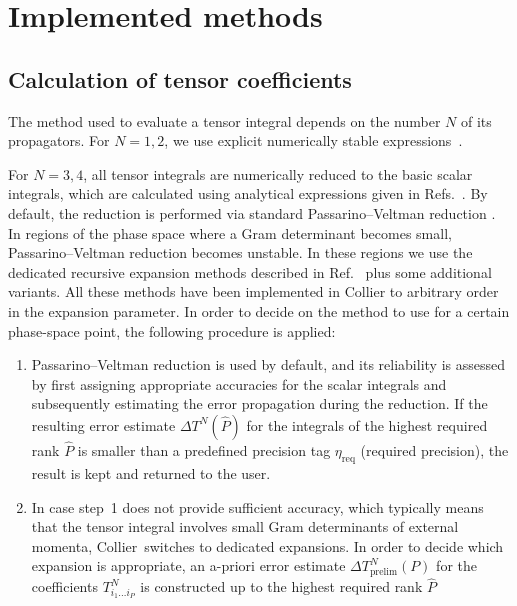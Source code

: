 \documentclass[preprint,sort&compress,12pt]{elsarticle}
\def\citere#1{\mbox{Ref.~\cite{#1}}}
\def\citeres#1{\mbox{Refs.~\cite{#1}}}
\newcommand{\collier}{{\sc Collier}}
\begin{document}
\section{Implemented methods}
\label{se:methods}

\subsection{Calculation of tensor coefficients}
\label{sec:calc-tensor-coefficients}

The method used to evaluate a tensor integral depends on the number
$N$ of its propagators. For $N=1,2$, we use explicit numerically stable
expressions~\cite{Passarino:1978jh,Denner:2005nn}.

\begin{sloppypar}
For $N=3,4$, all tensor integrals are numerically 
reduced to the basic scalar
integrals, which are calculated using analytical expressions
given in \citeres{Dittmaier:2003bc,'tHooft:1978xw,Denner:2010tr}.  By
default, the reduction is performed
via standard Passarino--Veltman reduction \cite{Passarino:1978jh}. In
regions of the phase space where a Gram determinant becomes small,
Passarino--Veltman reduction becomes unstable.  In these regions we
use the dedicated recursive expansion methods described in
\citere{Denner:2005nn} plus some additional variants. All
these methods have been implemented in {\collier} to arbitrary order
in the expansion parameter. In order to decide on the method to use
for a certain phase-space point, the following procedure is applied:
\begin{enumerate}
\item
Passarino--Veltman reduction is used by default, and
its reliability is assessed by first assigning appropriate
accuracies for the scalar integrals and subsequently
estimating the error propagation during the reduction.
If the resulting error estimate $\Delta T^N(\widehat{P})$
for the integrals of the highest required rank $\widehat{P}$
is smaller than a predefined precision tag $\eta_{\textrm{req}}$ (required precision),
the result is kept and returned to the user.
\item In case step~1 does not provide sufficient accuracy, which
  typically means that the tensor integral involves small Gram
  determinants of external momenta, \collier\ switches to dedicated
  expansions.  In order to decide which expansion is appropriate, an
  a-priori error estimate $\Delta T^N_{\mathrm{prelim}}(P)$ for the
  coefficients $T^N_{i_{1}\ldots i_{P}}$ 
is constructed up to the highest required rank $\widehat{P}$ 

\end{enumerate}
\end{sloppypar}
\end{document}
